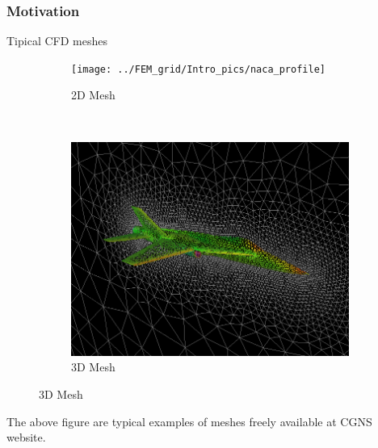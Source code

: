 \begin{frame} \frametitle{Motivation}
Tipical CFD meshes
\begin{figure}
        \centering
        \begin{subfigure}[b]{0.45\textwidth}
                \centering
                \texttt{[image: ../FEM\_grid/Intro\_pics/naca\_profile]}
                \caption{2D Mesh}
                \label{fig:naca_profile}
        \end{subfigure}%
				~ %
        \begin{subfigure}[b]{0.45\textwidth}
                \centering
                \includegraphics[trim = 0mm 0mm 0mm 0mm,clip,width=\textwidth]{../FEM_grid/Intro_pics/fighter}
                \caption{3D Mesh}
                \label{fig:fighter}
				\end{subfigure}
				\label{fig:CFD_meshes}
\end{figure}
	The above figure are typical examples of meshes freely available at CGNS website.
\end{frame}